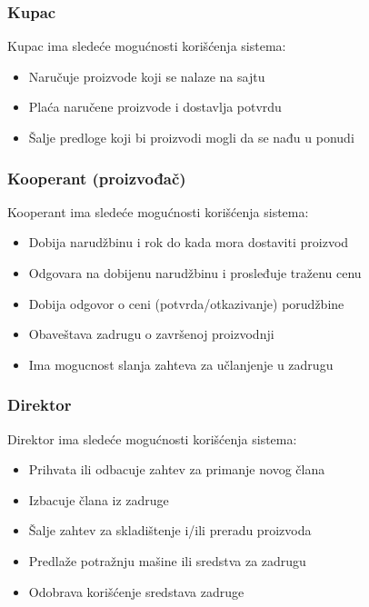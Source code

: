 \documentclass[a4paper]{article}
\begin{document}
\subsubsection{Kupac}
\indent Kupac ima sledeće mogućnosti korišćenja sistema:
\begin{itemize}
    \item Naručuje proizvode koji se nalaze na sajtu
    \item Plaća naručene proizvode i dostavlja potvrdu
    \item Šalje predloge koji bi proizvodi mogli da se nađu u ponudi
\end{itemize}

\subsubsection{Kooperant (proizvođač)}
\indent Kooperant ima sledeće mogućnosti korišćenja sistema:
\begin{itemize}
    \item Dobija narudžbinu i rok do kada mora dostaviti proizvod
    \item Odgovara na dobijenu narudžbinu i prosleđuje traženu cenu
    \item Dobija odgovor o ceni (potvrda/otkazivanje) porudžbine
    \item Obaveštava zadrugu o završenoj proizvodnji
    \item Ima mogucnost slanja zahteva za učlanjenje u zadrugu
\end{itemize}

\subsubsection{Direktor}
\indent Direktor ima sledeće mogućnosti korišćenja sistema:
\begin{itemize}
    \item Prihvata ili odbacuje zahtev za primanje novog člana
    \item Izbacuje člana iz zadruge
    \item Šalje zahtev za skladištenje i/ili preradu proizvoda
    \item Predlaže potražnju mašine ili sredstva za zadrugu
    \item Odobrava korišćenje sredstava zadruge
\end{itemize}

\end{document}
